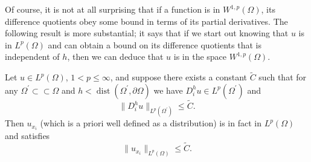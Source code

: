 Of course, it is not at all surprising that if a function is in $W^{1,p}(\Omega)$, its difference quotients obey some bound in terms of its partial derivatives. The following result is more substantial; it says that if we start out knowing that $u$ is in $L^p(\Omega)$ and can obtain a bound on its difference quotients that is independent of $h$, then we can deduce that $u$ is in the space $W^{1,p}(\Omega)$.

\begin{Lemma}
\label{lem:uniform-difference-quotient-converse}
Let $u\in L^p(\Omega)$, $1<p\leq\infty$, and suppose there exists a constant $\widetilde C$ such that for any $\Omega^{\prime}\subset\subset\Omega$ and $h<\operatorname{dist}(\Omega^{\prime},\partial\Omega)$ we have $D_i^hu\in L^p(\Omega^{\prime})$ and
\begin{equation}\label{eq:uniform-difference-quotient-converse-hypothesis}
\|D_i^hu\|_{L^p(\Omega^{\prime})}\leq\widetilde C.
\end{equation}
Then $u_{x_i}$ (which is a priori well defined as a distribution) is in fact in $L^p(\Omega)$ and satisfies
\begin{equation}\label{eq:uniform-difference-quotient-recovered-derivative-bound}
\|u_{x_i}\|_{L^p(\Omega)}\leq\widetilde C.
\end{equation}

\end{Lemma}

